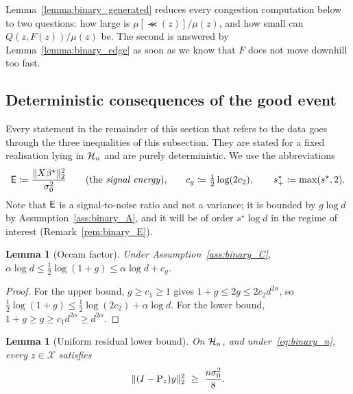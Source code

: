 \documentclass[aos]{imsart}%
\DeclarePairedDelimiter{\norm}{\lVert}{\rVert}
\newcommand{\ambientspace}[0]{\mathcal{X}}
\theoremstyle{plain}
\newtheorem{lemma}[theorem]{Lemma}
\theoremstyle{definition}
\begin{document}
    Lemma~\ref{lemma:binary_generated} reduces every congestion computation
    below to two questions: how large is $\mu[\Prec(z)]/\mu(z)$, and how small
    can $Q(z,F(z))/\mu(z)$ be. The second is answered by
    Lemma~\ref{lemma:binary_edge} as soon as we know that $F$ does not move
    downhill too fast.


    \subsection{Deterministic consequences of the good event}
    \label{sub:binary_deterministic}

    Every statement in the remainder of this section that refers to the data
    goes through the three inequalities of this subsection. They are stated for
    a fixed realisation lying in $\mathcal{H}_n$ and are purely deterministic. We use
    the abbreviations
    \begin{equation}
        \label{eq:binary_E}
        \Energy\coloneq\frac{\norm{X\beta^\star}_2^{2}}{\sigma_0^{2}}
        \qquad\text{(the \emph{signal energy}),}
        \qquad
        c_g\coloneq\tfrac12\log(2c_2),
        \qquad
        s^\star_+\coloneq\max(s^\star,2).
    \end{equation}
    Note that $\mathsf{E}$ is a signal-to-noise ratio and not a variance; it is
    bounded by $g\log d$ by Assumption~\ref{ass:binary_A}, and it will be of
    order $s^\star\log d$ in the regime of interest (Remark~\ref{rem:binary_E}).

    \begin{lemma}[Occam factor]
        \label{lemma:binary_occam}
        Under Assumption~\ref{ass:binary_C},
        $\alpha\log d\leq\tfrac12\log(1+g)\leq\alpha\log d+c_g$.
    \end{lemma}

    \begin{proof}
        For the upper bound, $g\geq c_1\geq1$ gives $1+g\leq2g\leq2c_2d^{2\alpha}$,
        so $\tfrac12\log(1+g)\leq\tfrac12\log(2c_2)+\alpha\log d$. For the lower
        bound, $1+g\geq g\geq c_1d^{2\alpha}\geq d^{2\alpha}$.
    \end{proof}

    \begin{lemma}[Uniform residual lower bound]
        \label{lemma:binary_residual}
        On $\mathcal{H}_n$, and under~\eqref{eq:binary_n}, every $z\in\ambientspace$
        satisfies
        \begin{equation}
            \label{eq:binary_residual}
            \norm{(I-\Proj_z)y}_2^{2}\ \geq\ \frac{n\sigma_0^{2}}{8}.
        \end{equation}
    \end{lemma}
\end{document}
